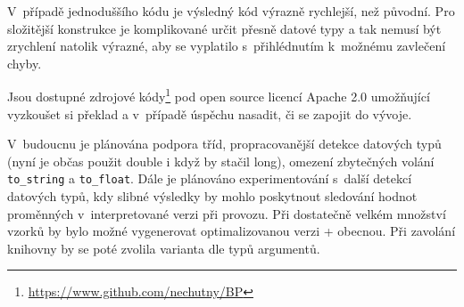 \documentclass[czech]{ExcelAtFIT}
\newcommand{\function}[1]{\texttt{#1}}
\begin{document}

	V~případě jednoduššího kódu je výsledný kód vý\-raz\-ně rychlejší, než původní. Pro složitější konstrukce je komplikované určit přesně datové typy a tak nemusí být zrychlení natolik výrazné, aby se vyplatilo s~přihlédnutím k~možnému zavlečení chyby.





	Jsou dostupné zdrojové kódy\footnote{\url{https://www.github.com/nechutny/BP}} pod open source licencí Apache 2.0 umožňující vyzkoušet si překlad a v~případě úspěchu nasadit, či se zapojit do vývoje.

	V~budoucnu je plánována podpora tříd, propracovanější detekce datových typů (nyní je občas použit double i když by stačil long), omezení zbytečných volání \function{to\_string} a \function{to\_float}. Dále je plánováno ex\-pe\-ri\-men\-to\-vá\-ní s~další detekcí datových typů, kdy slibné výsledky by mohlo poskytnout sledování hodnot pro\-měn\-ných v~interpretované verzi při provozu. Při dos\-ta\-teč\-ně velkém množství vzorků by bylo možné vygenerovat optimalizovanou verzi + obecnou. Při zavolání knihovny by se poté zvolila varianta dle typů argumentů.





\end{document}
